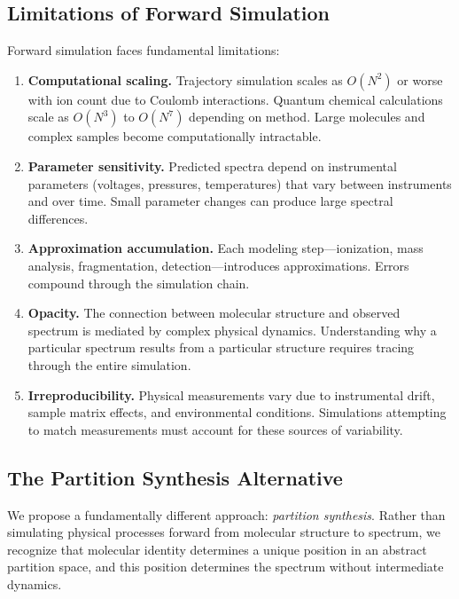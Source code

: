 \documentclass[twocolumn,10pt]{article}
\begin{document}
\subsection{Limitations of Forward Simulation}

Forward simulation faces fundamental limitations:

\begin{enumerate}[leftmargin=*]
\item \textbf{Computational scaling.} Trajectory simulation scales as $O(N^2)$ or worse with ion count due to Coulomb interactions. Quantum chemical calculations scale as $O(N^3)$ to $O(N^7)$ depending on method. Large molecules and complex samples become computationally intractable.

\item \textbf{Parameter sensitivity.} Predicted spectra depend on instrumental parameters (voltages, pressures, temperatures) that vary between instruments and over time. Small parameter changes can produce large spectral differences.

\item \textbf{Approximation accumulation.} Each modeling step---ionization, mass analysis, fragmentation, detection---introduces approximations. Errors compound through the simulation chain.

\item \textbf{Opacity.} The connection between molecular structure and observed spectrum is mediated by complex physical dynamics. Understanding why a particular spectrum results from a particular structure requires tracing through the entire simulation.

\item \textbf{Irreproducibility.} Physical measurements vary due to instrumental drift, sample matrix effects, and environmental conditions. Simulations attempting to match measurements must account for these sources of variability.
\end{enumerate}

\subsection{The Partition Synthesis Alternative}

We propose a fundamentally different approach: \emph{partition synthesis}. Rather than simulating physical processes forward from molecular structure to spectrum, we recognize that molecular identity determines a unique position in an abstract partition space, and this position determines the spectrum without intermediate dynamics.
\end{document}
